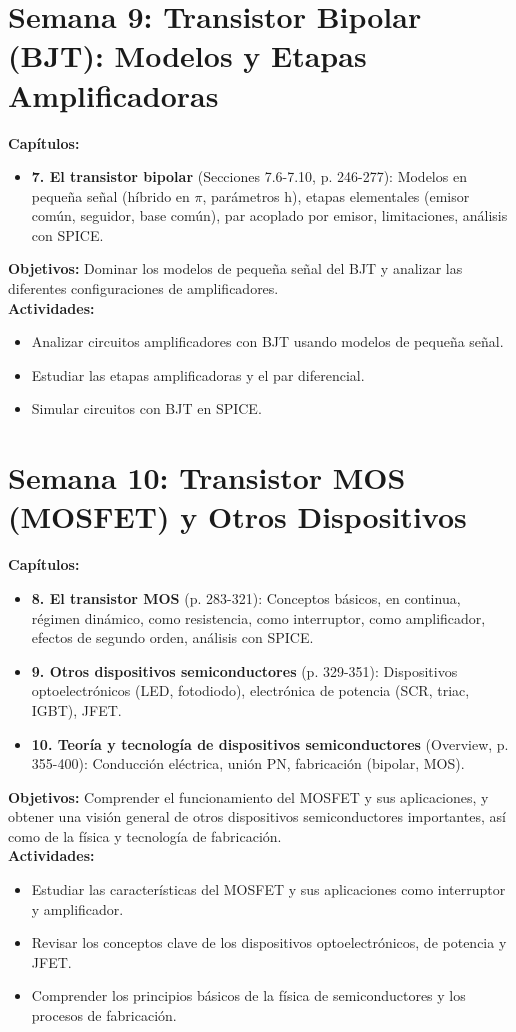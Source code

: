 \documentclass[12pt, a4paper]{article}
\begin{document}
\section{Semana 9: Transistor Bipolar (BJT): Modelos y Etapas Amplificadoras}
\textbf{Capítulos:}
\begin{itemize}
    \item \textbf{7. El transistor bipolar} (Secciones 7.6-7.10, p. 246-277): Modelos en pequeña señal (híbrido en $\pi$, parámetros h), etapas elementales (emisor común, seguidor, base común), par acoplado por emisor, limitaciones, análisis con SPICE.
\end{itemize}
\textbf{Objetivos:} Dominar los modelos de pequeña señal del BJT y analizar las diferentes configuraciones de amplificadores.\\
\textbf{Actividades:}
\begin{itemize}
    \item Analizar circuitos amplificadores con BJT usando modelos de pequeña señal.
    \item Estudiar las etapas amplificadoras y el par diferencial.
    \item Simular circuitos con BJT en SPICE.
\end{itemize}

\section{Semana 10: Transistor MOS (MOSFET) y Otros Dispositivos}
\textbf{Capítulos:}
\begin{itemize}
    \item \textbf{8. El transistor MOS} (p. 283-321): Conceptos básicos, en continua, régimen dinámico, como resistencia, como interruptor, como amplificador, efectos de segundo orden, análisis con SPICE.
    \item \textbf{9. Otros dispositivos semiconductores} (p. 329-351): Dispositivos optoelectrónicos (LED, fotodiodo), electrónica de potencia (SCR, triac, IGBT), JFET.
    \item \textbf{10. Teoría y tecnología de dispositivos semiconductores} (Overview, p. 355-400): Conducción eléctrica, unión PN, fabricación (bipolar, MOS).
\end{itemize}
\textbf{Objetivos:} Comprender el funcionamiento del MOSFET y sus aplicaciones, y obtener una visión general de otros dispositivos semiconductores importantes, así como de la física y tecnología de fabricación.\\
\textbf{Actividades:}
\begin{itemize}
    \item Estudiar las características del MOSFET y sus aplicaciones como interruptor y amplificador.
    \item Revisar los conceptos clave de los dispositivos optoelectrónicos, de potencia y JFET.
    \item Comprender los principios básicos de la física de semiconductores y los procesos de fabricación.
\end{itemize}
\end{document}
